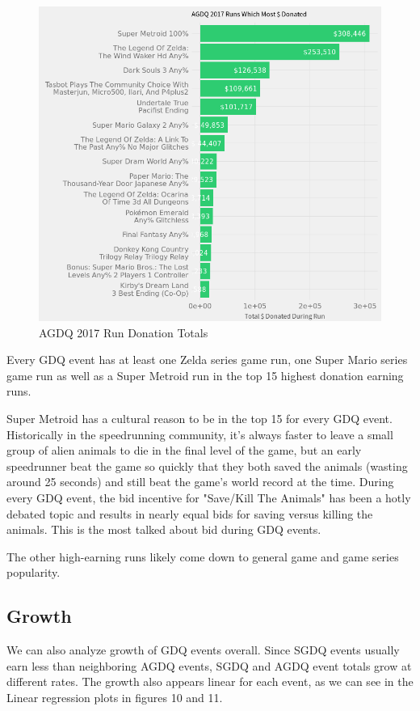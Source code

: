 \documentclass[journal]{IEEEtran}
\begin{document}
\begin{figure}
	\centering
	\includegraphics[scale=0.4]{A2017Runs}
	\caption{AGDQ 2017 Run Donation Totals}
\end{figure}

Every GDQ event has at least one Zelda series game run, one Super Mario series game run as well as a Super Metroid run in the top 15 highest donation earning runs.

Super Metroid has a cultural reason to be in the top 15 for every GDQ event. Historically in the speedrunning community, it's always faster to leave a small group of alien animals to die in the final level of the game, but an early speedrunner beat the game so quickly that they both saved the animals (wasting around 25 seconds) and still beat the game's world record at the time. During every GDQ event, the bid incentive for "Save/Kill The Animals" has been a hotly debated topic and results in nearly equal bids for saving versus killing the animals. This is the most talked about bid during GDQ events.

The other high-earning runs likely come down to general game and game series popularity.

\subsection{Growth}

We can also analyze growth of GDQ events overall. Since SGDQ events usually earn less than neighboring AGDQ events, SGDQ and AGDQ event totals grow at different rates. The growth also appears linear for each event, as we can see in the Linear regression plots in figures 10 and 11.
\end{document}
